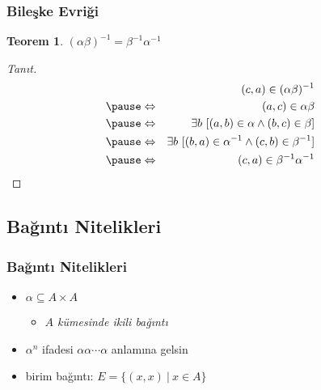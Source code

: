 \documentclass[dvipsnames]{beamer}
\theoremstyle{definition}
\theoremstyle{example}
\theoremstyle{plain}
\newtheorem{teorem}[theorem]{Teorem}
\begin{document}
\begin{frame}
  \frametitle{Bileşke Evriği}

  \begin{teorem}
    $(\alpha \beta)^{-1} = \beta^{-1} \alpha^{-1}$
  \end{teorem}

  \pause
  \begin{proof}[Tanıt]
    \begin{eqnarray*}
      &                 & (c,a) \in (\alpha \beta)^{-1}\\\pause
      & \Leftrightarrow & (a,c) \in \alpha \beta\\\pause
      & \Leftrightarrow & \exists b~[(a,b) \in \alpha
                              \wedge (b,c) \in \beta]\\\pause
      & \Leftrightarrow & \exists b~[(b,a) \in \alpha^{-1}
                              \wedge (c,b) \in \beta^{-1}]\\\pause
      & \Leftrightarrow & (c,a) \in \beta^{-1}\alpha^{-1}
    \end{eqnarray*}
  \end{proof}
\end{frame}

\subsection{Bağıntı Nitelikleri}

\begin{frame}
  \frametitle{Bağıntı Nitelikleri}

  \begin{itemize}
    \item $\alpha \subseteq A \times A$
    \begin{itemize}
      \item \emph{$A$ kümesinde ikili bağıntı}
    \end{itemize}

    \pause
    \medskip
    \item $\alpha^n$ ifadesi $\alpha \alpha \cdots \alpha$ anlamına gelsin

    \pause
    \medskip
    \item \alert{birim bağıntı}: $E = \{(x,x)~|~x \in A\}$
  \end{itemize}
\end{frame}
\end{document}
